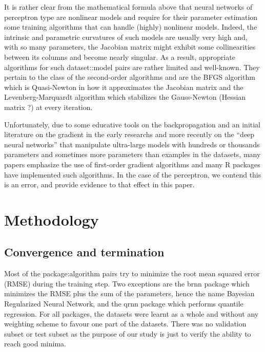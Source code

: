 It is rather clear from the mathematical formula above that neural
networks of perceptron type are nonlinear models and require for their
parameter estimation some training algorithms that can handle (highly)
nonlinear models. Indeed, the intrinsic and parametric curvatures of
such models are usually very high and, with so many parameters, the
Jacobian matrix might exhibit some collinearities between its columns
and become nearly singular. As a result, appropriate algorithms for such
dataset::model pairs are rather limited and well-known. They pertain to
the class of the second-order algorithms and are the BFGS algorithm
which is Quasi-Newton in how it approximates the Jacobian matrix and the
Levenberg-Marquardt algorithm which stabilizes the Gauss-Newton (Hessian
matrix ?) at every iteration.

Unfortunately, due to some educative tools on the backpropagation and an
initial literature on the gradient in the early researchs and more
recently on the ``deep neural networks'' that manipulate ultra-large
models with hundreds or thousands parameters and sometimes more
parameters than examples in the datasets, many papers emphasize the use
of first-order gradient algorithms and many R packages have implemented
such algorithms. In the case of the perceptron, we contend this is an
error, and provide evidence to that effect in this paper.

\hypertarget{methodology}{%
\section{Methodology}\label{methodology}}

\hypertarget{convergence-and-termination}{%
\subsection{Convergence and
termination}\label{convergence-and-termination}}

Most of the package:algorithm pairs try to minimize the root mean
squared error (RMSE) during the training step. Two exceptions are the
brnn package which minimizes the RMSE plus the sum of the parameters,
hence the name Bayesian Regularized Neural Network, and the qrnn package
which performs quantile regression. For all packages, the datasets were
learnt as a whole and without any weighting scheme to favour one part of
the datasets. There was no validation subset or test subset as the
purpose of our study is just to verify the ability to reach good minima.

